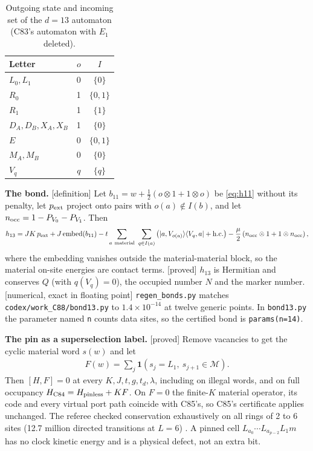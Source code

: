 \documentclass[11pt]{article}
\newcommand{\tg}[1]{\textsf{[#1]}}
\newcommand{\kb}[2]{|#1\rangle\langle #2|}
\newcommand{\repo}[1]{\texttt{#1}}
\begin{document}
\begin{table}[h]
\centering
\begin{tabular}{lcc}
\toprule
Letter & $o$ & $I$\\
\midrule
$L_0,L_1$ & 0 & $\{0\}$\\
$R_0$ & 1 & $\{0,1\}$\\
$R_1$ & 1 & $\{1\}$\\
$D_A,D_B,X_A,X_B$ & 1 & $\{0\}$\\
$E$ & 0 & $\{0,1\}$\\
$M_A,M_B$ & 0 & $\{0\}$\\
$V_q$ & $q$ & $\{q\}$\\
\bottomrule
\end{tabular}
\caption{Outgoing state and incoming set of the $d=13$ automaton (C83's automaton with $E_1$ deleted).}\label{tab:auto}
\end{table}

\textbf{The bond.} \tg{definition} Let $b_{11}=w+\frac12(o\otimes1+1\otimes o)$ be \eqref{eq:h11} without its penalty, let $p_{\rm ext}$ project onto pairs with $o(a)\notin I(b)$, and let $n_{\rm occ}=1-P_{V_0}-P_{V_1}$. Then
\begin{align}
h_{13}=JK\,p_{\rm ext}+J\,\mathrm{embed}(b_{11})-t\sum_{a\ \rm material}\ \sum_{q\in I(a)}\left(\kb{a,V_{o(a)}}{V_q,a}+\text{h.c.}\right)-\frac{\mu}{2}\left(n_{\rm occ}\otimes1+1\otimes n_{\rm occ}\right),\label{eq:h13}
\end{align}
where the embedding vanishes outside the material-material block, so the material on-site energies are contact terms. \tg{proved} $h_{13}$ is Hermitian and conserves $Q$ (with $q(V_q)=0$), the occupied number $N$ and the marker number. \tg{numerical, exact in floating point} \repo{regen\_bonds.py} matches \repo{codex/work\_C88/bond13.py} to $1.4\times10^{-14}$ at twelve generic points. In \repo{bond13.py} the parameter named \texttt{n} counts data sites, so the certified bond is \texttt{params(n=14)}.

\textbf{The pin as a superselection label.} \tg{proved} Remove vacancies to get the cyclic material word $s(w)$ and let
\begin{align}
F(w)=\sum_j \mathbf{1}\left(s_j=L_1,\ s_{j+1}\in\mathcal{M}\right).\label{eq:F}
\end{align}
Then $[H,F]=0$ at every $K,J,t,g,t_d,\lambda$, including on illegal words, and on full occupancy $H_{\rm C84}=H_{\rm pinless}+KF$. On $F=0$ the finite-$K$ material operator, its code and every virtual port path coincide with C85's, so C85's certificate applies unchanged. The referee checked conservation exhaustively on all rings of 2 to 6 sites (12.7 million directed transitions at $L=6$) \cite{refC88}. A pinned cell $L_{a_0}\cdots L_{a_{p-2}}L_1m$ has no clock kinetic energy and is a physical defect, not an extra bit.
\end{document}
